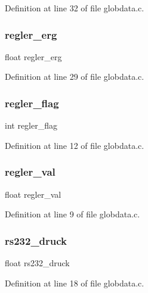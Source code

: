 Definition at line 32 of file globdata.\+c.

\mbox{\label{globdata_8h_af303002e2042a7cd996291fbac733cb2}} 
\subsubsection{regler\+\_\+erg}
{\footnotesize\ttfamily float regler\+\_\+erg}



Definition at line 29 of file globdata.\+c.

\mbox{\label{globdata_8h_ad6dcaa50b11e478cb7706ed143b82837}} 
\subsubsection{regler\+\_\+flag}
{\footnotesize\ttfamily int regler\+\_\+flag}



Definition at line 12 of file globdata.\+c.

\mbox{\label{globdata_8h_a0eecadd795d0c4e1d51322cd4969148b}} 
\subsubsection{regler\+\_\+val}
{\footnotesize\ttfamily float regler\+\_\+val}



Definition at line 9 of file globdata.\+c.

\mbox{\label{globdata_8h_a6c4556f3dbc9d8b11f81ecbbe2c2a2e9}} 
\subsubsection{rs232\+\_\+druck}
{\footnotesize\ttfamily float rs232\+\_\+druck}



Definition at line 18 of file globdata.\+c.

\mbox{\label{globdata_8h_a0b947c7fa3c33a9aeeb2be98bf21310d}} 
